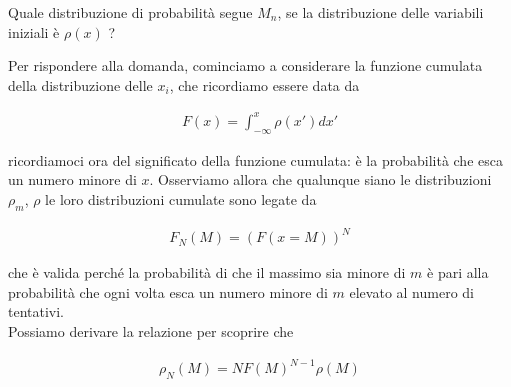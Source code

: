 \documentclass{report}
\begin{document}
Quale distribuzione di probabilità segue \(M_n\), se la distribuzione delle variabili iniziali è \(\rho(x)\) ? 

Per rispondere alla domanda, cominciamo a considerare la funzione cumulata della distribuzione delle \(x_i\), che ricordiamo essere data da 

\begin{align}
    F(x) = \int_{-\infty}^x \rho(x')dx'
\end{align}

ricordiamoci ora del significato della funzione cumulata: è la probabilità che esca un numero minore di \(x\). Osserviamo allora che qualunque siano le distribuzioni \(\rho_m\), \(\rho\) le loro distribuzioni cumulate sono legate da 

\begin{align}
    F_N (M) = (F(x=M))^N
\end{align}

che è valida perché la probabilità di che il massimo sia minore di \(m\) è pari alla probabilità che ogni volta esca un numero minore di \(m\) elevato al numero di tentativi.\\ 

Possiamo derivare la relazione per scoprire che 

\begin{align}
    \rho_N(M) = N F(M)^{N-1}\rho(M)
\end{align}

\end{document}
